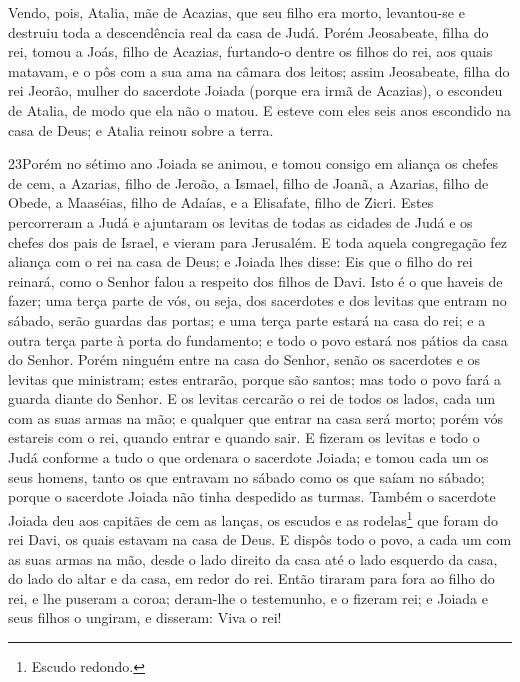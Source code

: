 Vendo, pois, Atalia, mãe de Acazias, que seu filho era morto,
levantou-se e destruiu toda a descendência real da casa de Judá.
Porém Jeosabeate, filha do rei, tomou a Joás, filho de
Acazias, furtando-o dentre os filhos do rei, aos quais matavam, e o
pôs com a sua ama na câmara dos leitos; assim Jeosabeate, filha do
rei Jeorão, mulher do sacerdote Joiada (porque era irmã de Acazias),
o escondeu de Atalia, de modo que ela não o matou. E esteve
com eles seis anos escondido na casa de Deus; e Atalia reinou sobre
a terra.

\medskip

\lettrine{23} Porém no sétimo ano Joiada se animou, e tomou
consigo em aliança os chefes de cem, a Azarias, filho de Jeroão, a
Ismael, filho de Joanã, a Azarias, filho de Obede, a Maaséias, filho
de Adaías, e a Elisafate, filho de Zicri. Estes percorreram a
Judá e ajuntaram os levitas de todas as cidades de Judá e os chefes
dos pais de Israel, e vieram para Jerusalém. E toda aquela
congregação fez aliança com o rei na casa de Deus; e Joiada lhes
disse: Eis que o filho do rei reinará, como o Senhor falou a
respeito dos filhos de Davi. Isto é o que haveis de fazer; uma
terça parte de vós, ou seja, dos sacerdotes e dos levitas que entram
no sábado, serão guardas das portas; e uma terça parte estará na
casa do rei; e a outra terça parte à porta do fundamento; e todo o
povo estará nos pátios da casa do Senhor. Porém ninguém entre na
casa do Senhor, senão os sacerdotes e os levitas que ministram;
estes entrarão, porque são santos; mas todo o povo fará a guarda
diante do Senhor. E os levitas cercarão o rei de todos os lados,
cada um com as suas armas na mão; e qualquer que entrar na casa será
morto; porém vós estareis com o rei, quando entrar e quando sair.
E fizeram os levitas e todo o Judá conforme a tudo o que
ordenara o sacerdote Joiada; e tomou cada um os seus homens, tanto
os que entravam no sábado como os que saíam no sábado; porque o
sacerdote Joiada não tinha despedido as turmas. Também o
sacerdote Joiada deu aos capitães de cem as lanças, os escudos e as
rodelas\footnote{Escudo redondo.} que foram do rei Davi, os quais
estavam na casa de Deus. E dispôs todo o povo, a cada um com
as suas armas na mão, desde o lado direito da casa até o lado
esquerdo da casa, do lado do altar e da casa, em redor do rei.
Então tiraram para fora ao filho do rei, e lhe puseram a
coroa; deram-lhe o testemunho, e o fizeram rei; e Joiada e seus
filhos o ungiram, e disseram: Viva o rei!

